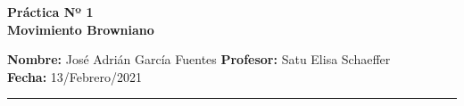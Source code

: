 \documentclass[a4paper]{article}
\begin{document}
\begin{center} %
\large \bf Práctica Nº 1   %
\\ %
Movimiento Browniano
\end{center} %
\textbf{Nombre:}   %
José Adrián García Fuentes
\hfill  %
\textbf{Profesor:}   %
Satu Elisa Schaeffer \hfill
\\
\textbf{Fecha:} 13/Febrero/2021        %
\\
\hrule    %
\medskip
\end{document}
